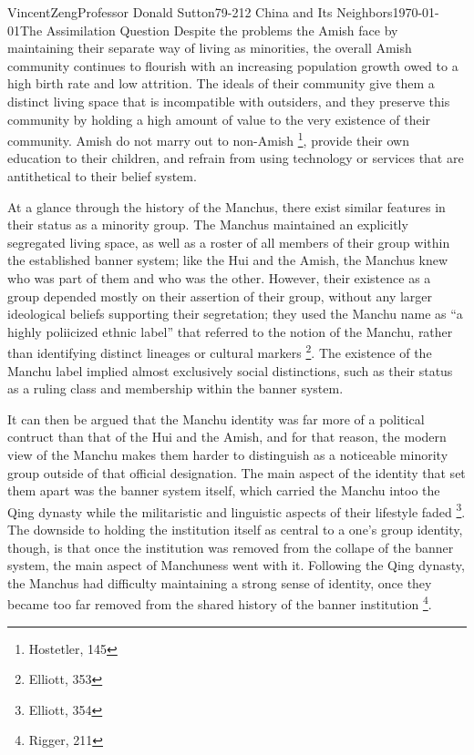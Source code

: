 \documentclass{article}[12pt]
\begin{document}
\begin{mla}{Vincent}{Zeng}{Professor Donald Sutton}{79-212 China and Its Neighbors}{\today}{The Assimilation Question}
Despite the problems the Amish face by maintaining their separate way
of living as minorities, the overall Amish community continues to flourish with
an increasing population growth owed to a high birth rate and low attrition.
The ideals of
their community give them a distinct living space that is incompatible with
outsiders, and they preserve this community by holding a high amount of value
to the very existence of their community. Amish do not marry out to non-Amish
\footnote{Hostetler, 145}, provide their own education to their children, and
refrain from using technology or services that are antithetical to their belief
system.

At a glance through the history of the Manchus, there exist similar features in
their status as a minority group. The Manchus maintained an explicitly
segregated living space, as well as a roster of all members of their group
within the established banner system; like the Hui and the Amish, the Manchus
knew who was part of them and who was the other. However, their existence as a
group depended mostly on their assertion of their group, without any larger
ideological beliefs supporting their segretation; they used the Manchu name as
``a highly poliicized ethnic label'' that referred to the notion of the Manchu,
rather than identifying distinct lineages or cultural markers \footnote{Elliott,
353}. The existence of the Manchu label implied almost exclusively social distinctions, such as their status as a ruling class and membership within the banner system.

It can then be argued that the Manchu identity was far more of a political
contruct than that of the Hui and the Amish, and for that reason, the modern
view of the Manchu makes them harder to distinguish as a noticeable minority
group outside of that official designation. The main aspect of the identity
that set them apart was the banner system itself, which carried the Manchu
intoo the Qing dynasty while the militaristic and linguistic aspects of their
lifestyle faded \footnote{Elliott, 354}. The downside to holding the
institution itself as central to a one's group identity, though, is that once
the institution was removed from the collape of the banner system, the main
aspect of Manchuness went with it. Following the Qing dynasty, the Manchus had
difficulty maintaining a strong sense of identity, once they became too far
removed from the shared history of the banner institution \footnote{Rigger,
211}.


\end{mla}
\end{document}
